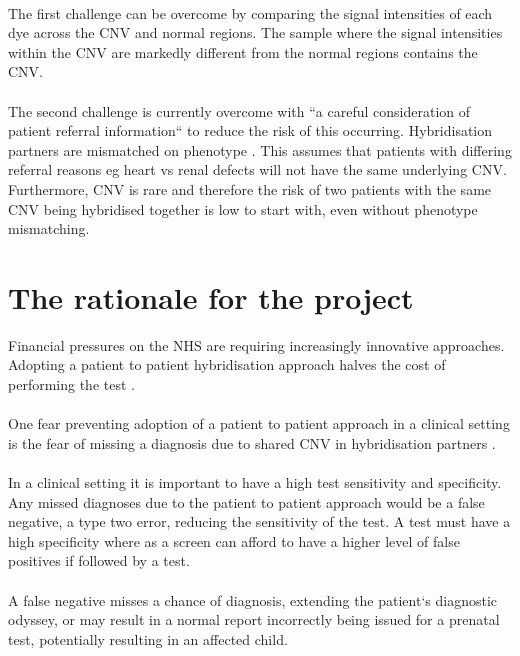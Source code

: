 \paragraph*{}
The first challenge can be overcome by comparing the signal intensities of each dye across the CNV and normal regions. The sample where the signal intensities within the CNV are markedly different from the normal regions contains the CNV.

\paragraph*{}
The second challenge is currently overcome with ``a careful consideration of patient referral information`` to reduce the risk of this occurring. Hybridisation partners are mismatched on phenotype \cite{ahn2010}. This assumes that patients with differing referral reasons eg heart vs renal defects will not have the same underlying CNV. Furthermore, CNV is rare and therefore the risk of two patients with the same CNV being hybridised together is low to start with, even without phenotype mismatching.

\section{The rationale for the project}
Financial pressures on the NHS are requiring increasingly innovative approaches. Adopting a patient to patient hybridisation approach halves the cost of performing the test \cite{ahn2010}.
\paragraph*{}
One fear preventing adoption of a patient to patient approach in a clinical setting is the fear of missing a diagnosis due to shared CNV in hybridisation partners \cite{dunlop2015}. 
\paragraph*{}
In a clinical setting it is important to have a high test sensitivity and specificity. Any missed diagnoses due to the patient to patient approach would be a false negative, a type two error, reducing the sensitivity of the test.  A test must have a high specificity where as a screen can afford to have a higher level of false positives if followed by a test.
\paragraph*{}
A false negative misses a chance of diagnosis, extending the patient`s diagnostic odyssey, or may result in a normal report incorrectly being issued for a prenatal test, potentially resulting in an affected child. 
